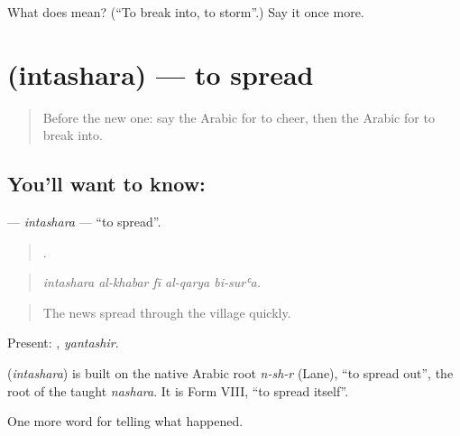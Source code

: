 \begin{tcolorbox}[breakable,colback=teal!4,colframe=teal!35!black,title={Before you move on}]
What does  mean? (\textquotedblleft{}To break into, to storm\textquotedblright{}.) Say it once more.
\end{tcolorbox}
\section[\texorpdfstring{\ar{انتشر} (intashara)}{انتشر (intashara)}]{ (intashara) — to spread}

\label{lesson:AR-C353-intashara}



\begin{quote}
Before the new one: say the Arabic for to cheer, then the Arabic for to break into.
\end{quote}

\subsection*{You'll want to know: }
\textbf{} — \emph{intashara} — \textquotedblleft{}to spread\textquotedblright{}.

\begin{quote}
    .
\end{quote}

\begin{quote}
\emph{intashara al-khabar fī al-qarya bi-surʿa.}
\end{quote}

\begin{quote}
The news spread through the village quickly.
\end{quote}

Present: , \emph{yantashir}.

\begin{cousinweb}
\textbf{} (\emph{intashara}) is built on the native Arabic root \emph{n-sh-r} (Lane), \textquotedblleft{}to spread out\textquotedblright{}, the root of the taught \emph{nashara}. It is Form VIII, \textquotedblleft{}to spread itself\textquotedblright{}.
\end{cousinweb}

\begin{grammarlens}[title={What you've built}]
One more word for telling what happened.
\end{grammarlens}

